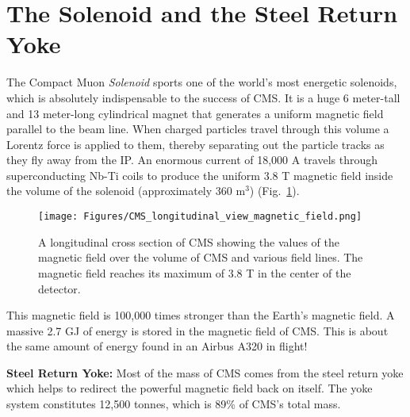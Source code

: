 \section{The Solenoid and the Steel Return Yoke}
\label{sec:solenoid}

The Compact Muon \emph{Solenoid} sports one of the world's most energetic solenoids, which is absolutely indispensable to the success of CMS.
It is a huge 6 meter-tall and 13 meter-long cylindrical magnet that generates a uniform magnetic field parallel to the beam line.
When charged particles travel through this volume a Lorentz force is applied to them,
thereby separating out the particle tracks as they fly away from the IP.
An enormous current of 18,000 A travels through superconducting Nb-Ti coils to produce the uniform 3.8 T magnetic field inside the volume of the solenoid (approximately 360 m$^3$)
 (Fig.~\ref{fig:cms_magnetic_field}).
\begin{figure}[pbth]
\centering
\texttt{[image: Figures/CMS\_longitudinal\_view\_magnetic\_field.png]}
    \caption{
    A longitudinal cross section of CMS showing the values of the magnetic field over the volume of CMS and various field lines. 
    The magnetic field reaches its maximum of 3.8 T in the center of the detector.}
    \label{fig:cms_magnetic_field}
\end{figure}
This magnetic field is 100,000 times stronger than the Earth's magnetic field.
A massive 2.7 GJ of energy is stored in the magnetic field of CMS. 
This is about the same amount of energy found in an Airbus A320 in flight!

{\bf Steel Return Yoke:} 
Most of the mass of CMS comes from the steel return yoke which helps to redirect the powerful magnetic field back on itself. 
The yoke system constitutes 12,500 tonnes, which is 89\% of CMS's total mass.

